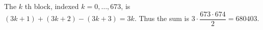 The $k$ th block, indexed $k=0,\ldots,673$, is $(3k+1)+(3k+2)-(3k+3)=3k$. Thus the sum is $3\cdot\dfrac{673\cdot674}{2}=\boxed{680403}$.
